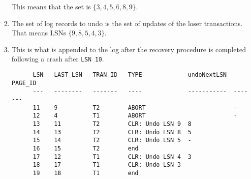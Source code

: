 \documentclass[11pt]{article}
\begin{document}
\begin{enumerate}
    This means that the set is $\{3,4,5,6,8,9\}$.
  \item
    The set of log records to undo is the set of updates of the loser transactions. That means LSNs $\{9,8,5,4,3\}$.
  \item
    This is what is appended to the log after the recovery procedure is completed
    following a crash after \verb|LSN 10|.
    \begin{verbatim}
      LSN   LAST_LSN   TRAN_ID   TYPE             undoNextLSN  PAGE_ID
      ---   --------   -------   ----             -----------  -------
      11    9          T2        ABORT                         -
      12    4          T1        ABORT                         -
      13    11         T2        CLR: Undo LSN 9  8
      14    13         T2        CLR: Undo LSN 8  5
      15    14         T2        CLR: Undo LSN 5  -
      16    15         T2        end
      17    12         T1        CLR: Undo LSN 4  3
      18    17         T1        CLR: Undo LSN 3  -
      19    18         T1        end
    \end{verbatim}
\end{enumerate}
\end{document}
